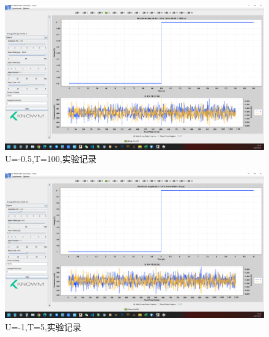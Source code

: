 \documentclass[12pt,hyperref,a4paper,UTF8]{ctexart}
\begin{document}
\begin{figure}[H]
    \centering
    \begin{minipage}{1\textwidth}
        \centering
        \includegraphics[width=1\textwidth]{figures/U-05T100.png}
        \caption{U=-0.5,T=100,实验记录}
        \label{fig:U-05T100}
    \end{minipage}
\end{figure}

\begin{figure}[H]
    \centering
    \begin{minipage}{1\textwidth}
        \centering
        \includegraphics[width=1\textwidth]{figures/U-1T5.png}
        \caption{U=-1,T=5,实验记录}
        \label{fig:U-1T5}
    \end{minipage}
\end{figure}
\end{document}
